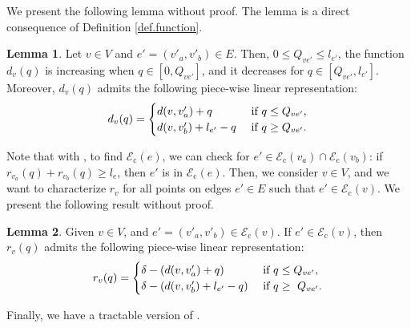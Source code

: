 \documentclass[review]{elsarticle}
\newcommand{\cE}{{\mathcal E}}
\newcommand{\dlt}{{\delta}}
\theoremstyle{definition}
\newtheorem{lemma}{Lemma}[section]
\begin{document}
We present the following lemma without proof. The lemma is a direct consequence of Definition \ref{def.function}.
\begin{lemma}\label{lem.pieces}
Let $v\in V$ and $e'=(v'_a,v'_b)\in E$. Then, $0 \le Q_{ve'} \le l_{e'}$, the function $d_v(q)$ is increasing when $q\in [0, Q_{ve'}]$, and it decreases for $q\in[Q_{ve'}, l_{e'}]$. Moreover, $d_v(q)$ admits the following piece-wise linear representation:
\begin{equation*}
	d_v(q) = \begin{cases}
	d(v,v'_a)+q & \textup{ if }q \le Q_{ve'}, \\
	d(v,v'_b)+l_{e'}-q & \textup{ if }q \ge Q_{ve'}. \\   
	\end{cases}
\end{equation*}
\end{lemma}

Note that with  , to find $\cE_{\mathrm{c}}(e)$, we can check  for $e' \in \cE_{\mathrm{c}}(v_a) \cap \cE_{\mathrm{c}}(v_b)$: if $ r_{v_a}(q)+r_{v_b}(q)\geq l_e$, then $e'$ is in  $\cE_{\mathrm{c}}(e)$. Then, we consider $v \in V$, and we want to characterize $r_v$ for all points on edges $e'\in E$ such that $e' \in \cE_{\mathrm{c}}(v)$. We present the following result without proof.


\begin{lemma}
Given $v \in V$, and $e'=(v'_a,v'_b) \in \cE_{\mathrm{c}}(v)$. If $e'\in \cE_{\mathrm{c}}(v)$, then $r_v(q)$ admits the following piece-wise linear representation:
\begin{equation*}
	r_v(q) = \begin{cases}
	\dlt - (d(v,v'_a) + q) & \textup{ if }q \le Q_{ve'}, \\
	\dlt- (d(v,v'_b)+l_{e'}-q) & \textup{ if }q \ge \ Q_{ve'}. \\   
	\end{cases}
\end{equation*}
\end{lemma}

Finally, we have a tractable version of .
\end{document}
